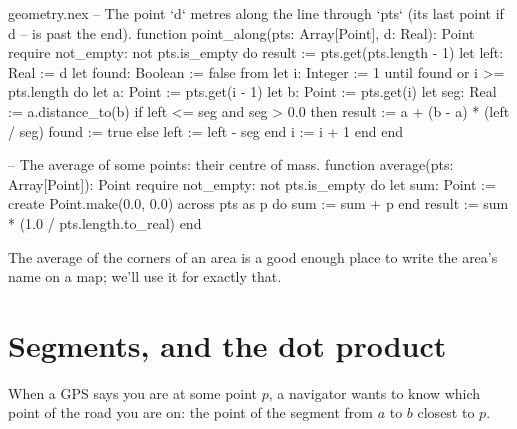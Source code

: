\begin{append}{geometry.nex}
-- The point `d` metres along the line through `pts` (its last point if d
-- is past the end).
function point_along(pts: Array[Point], d: Real): Point
require
  not_empty: not pts.is_empty
do
  result := pts.get(pts.length - 1)
  let left: Real := d
  let found: Boolean := false
  from
    let i: Integer := 1
  until
    found or i >= pts.length
  do
    let a: Point := pts.get(i - 1)
    let b: Point := pts.get(i)
    let seg: Real := a.distance_to(b)
    if left <= seg and seg > 0.0 then
      result := a + (b - a) * (left / seg)
      found := true
    else
      left := left - seg
    end
    i := i + 1
  end
end

-- The average of some points: their centre of mass.
function average(pts: Array[Point]): Point
require
  not_empty: not pts.is_empty
do
  let sum: Point := create Point.make(0.0, 0.0)
  across pts as p do
    sum := sum + p
  end
  result := sum * (1.0 / pts.length.to_real)
end
\end{append}

The average of the corners of an area is a good enough place to write the
area's name on a map; we'll use it for exactly that.

\section{Segments, and the dot product}

When a GPS says you are at some point $p$, a navigator wants to know which
point of the road you are on: the point of the segment from $a$ to $b$
closest to $p$.

\begin{center}
\end{center}

